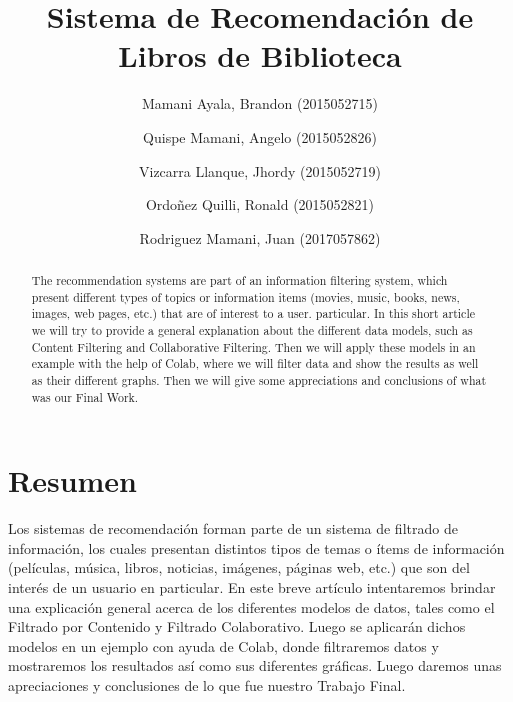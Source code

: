 \documentclass[preprint,12pt]{elsarticle}
\begin{document}
	
	\begin{frontmatter}
		
		
		\title{\huge Sistema de Recomendación de Libros de Biblioteca}
		\author{Mamani Ayala, Brandon        (2015052715)}
		\author{Quispe Mamani, Angelo	      (2015052826)}
		\author{Vizcarra Llanque, Jhordy	      (2015052719)}
		\author{Ordoñez Quilli, Ronald          (2015052821)}
		\author{Rodriguez Mamani, Juan      (2017057862)}
		
		\address{Tacna, Perú}
		
		\begin{abstract}
			
The recommendation systems are part of an information filtering system, which present different types of topics or information items (movies, music, books, news, images, web pages, etc.) that are of interest to a user. particular. In this short article we will try to provide a general explanation about the different data models, such as Content Filtering and Collaborative Filtering.
Then we will apply these models in an example with the help of Colab, where we will filter data and show the results as well as their different graphs.
Then we will give some appreciations and conclusions of what was our Final Work.\\
		\end{abstract}
\end{frontmatter}

	
	
	\section{Resumen}
Los sistemas de recomendación forman parte de un sistema de filtrado de información, los cuales presentan distintos tipos de temas o ítems de información (películas, música, libros, noticias, imágenes, páginas web, etc.) que son del interés de un usuario en particular. En este breve artículo intentaremos brindar una explicación general acerca de los diferentes modelos de datos, tales como el Filtrado por Contenido y Filtrado Colaborativo.
Luego se aplicarán dichos modelos en un ejemplo con ayuda de Colab, donde filtraremos datos y mostraremos los resultados así como sus diferentes gráficas.
Luego daremos unas apreciaciones y conclusiones de lo que fue nuestro Trabajo Final.\\
	
	
\end{document}
